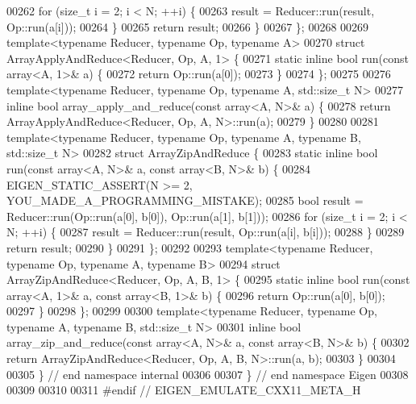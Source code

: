 \begin{DoxyCode}
00262     \textcolor{keywordflow}{for} (\textcolor{keywordtype}{size\_t} i = 2; i < N; ++i) \{
00263       result = Reducer::run(result, Op::run(a[i]));
00264     \}
00265     \textcolor{keywordflow}{return} result;
00266   \}
00267 \};
00268 
00269 \textcolor{keyword}{template}<\textcolor{keyword}{typename} Reducer, \textcolor{keyword}{typename} Op, \textcolor{keyword}{typename} A>
00270 \textcolor{keyword}{struct }ArrayApplyAndReduce<Reducer, Op, A, 1>  \{
00271   \textcolor{keyword}{static} \textcolor{keyword}{inline} \textcolor{keywordtype}{bool} run(\textcolor{keyword}{const} array<A, 1>& a) \{
00272     \textcolor{keywordflow}{return} Op::run(a[0]);
00273   \}
00274 \};
00275 
00276 \textcolor{keyword}{template}<\textcolor{keyword}{typename} Reducer, \textcolor{keyword}{typename} Op, \textcolor{keyword}{typename} A, std::\textcolor{keywordtype}{size\_t} N>
00277 \textcolor{keyword}{inline} \textcolor{keywordtype}{bool} array\_apply\_and\_reduce(\textcolor{keyword}{const} array<A, N>& a) \{
00278   \textcolor{keywordflow}{return} ArrayApplyAndReduce<Reducer, Op, A, N>::run(a);
00279 \}
00280 
00281 \textcolor{keyword}{template}<\textcolor{keyword}{typename} Reducer, \textcolor{keyword}{typename} Op, \textcolor{keyword}{typename} A, \textcolor{keyword}{typename} B, std::\textcolor{keywordtype}{size\_t} N>
00282 \textcolor{keyword}{struct }ArrayZipAndReduce \{
00283   \textcolor{keyword}{static} \textcolor{keyword}{inline} \textcolor{keywordtype}{bool} run(\textcolor{keyword}{const} array<A, N>& a, \textcolor{keyword}{const} array<B, N>& b) \{
00284     EIGEN\_STATIC\_ASSERT(N >= 2, YOU\_MADE\_A\_PROGRAMMING\_MISTAKE);
00285     \textcolor{keywordtype}{bool} result = Reducer::run(Op::run(a[0], b[0]), Op::run(a[1], b[1]));
00286     \textcolor{keywordflow}{for} (\textcolor{keywordtype}{size\_t} i = 2; i < N; ++i) \{
00287       result = Reducer::run(result, Op::run(a[i], b[i]));
00288     \}
00289     \textcolor{keywordflow}{return} result;
00290   \}
00291 \};
00292 
00293 \textcolor{keyword}{template}<\textcolor{keyword}{typename} Reducer, \textcolor{keyword}{typename} Op, \textcolor{keyword}{typename} A, \textcolor{keyword}{typename} B>
00294 \textcolor{keyword}{struct }ArrayZipAndReduce<Reducer, Op, A, B, 1> \{
00295   \textcolor{keyword}{static} \textcolor{keyword}{inline} \textcolor{keywordtype}{bool} run(\textcolor{keyword}{const} array<A, 1>& a, \textcolor{keyword}{const} array<B, 1>& b) \{
00296     \textcolor{keywordflow}{return} Op::run(a[0], b[0]);
00297   \}
00298 \};
00299 
00300 \textcolor{keyword}{template}<\textcolor{keyword}{typename} Reducer, \textcolor{keyword}{typename} Op, \textcolor{keyword}{typename} A, \textcolor{keyword}{typename} B, std::\textcolor{keywordtype}{size\_t} N>
00301 \textcolor{keyword}{inline} \textcolor{keywordtype}{bool} array\_zip\_and\_reduce(\textcolor{keyword}{const} array<A, N>& a, \textcolor{keyword}{const} array<B, N>& b) \{
00302   \textcolor{keywordflow}{return} ArrayZipAndReduce<Reducer, Op, A, B, N>::run(a, b);
00303 \}
00304 
00305 \}  \textcolor{comment}{// end namespace internal}
00306 
00307 \}  \textcolor{comment}{// end namespace Eigen}
00308 
00309 
00310 
00311 \textcolor{preprocessor}{#endif  // EIGEN\_EMULATE\_CXX11\_META\_H}
\end{DoxyCode}
